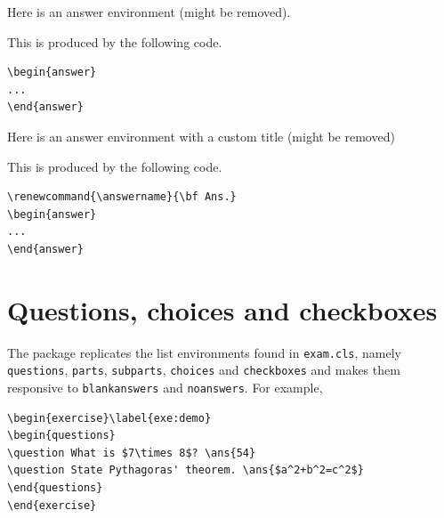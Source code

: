 \documentclass{article}
\theoremstyle{break}
\newtheorem{exercise}[theorem]{\exercisename}
\begin{document}
Here is an answer environment (might be removed).
\begin{answer}
\lipsum[1]
\end{answer}

This is produced by the following code.
\begin{Verbatim}[frame=single]
\begin{answer}
...
\end{answer}
\end{Verbatim}

Here is an answer environment with a custom title (might be removed)

\renewcommand{\answername}{\bf Ans.}
\begin{answer}
\lipsum[1]
\end{answer}

This is produced by the following code.
\begin{Verbatim}[frame=single]
\renewcommand{\answername}{\bf Ans.}
\begin{answer}
...
\end{answer}
\end{Verbatim}

\section{Questions, choices and checkboxes}

The package replicates the list environments found in {\tt exam.cls}, namely {\tt questions}, {\tt parts}, {\tt subparts}, {\tt choices} and {\tt checkboxes} and makes them responsive to {\tt blankanswers} and {\tt noanswers}. For example,

\begin{Verbatim}[frame=single]
\begin{exercise}\label{exe:demo}
\begin{questions}
\question What is $7\times 8$? \ans{54}
\question State Pythagoras' theorem. \ans{$a^2+b^2=c^2$}
\end{questions}
\end{exercise}
\end{Verbatim}
\end{document}
